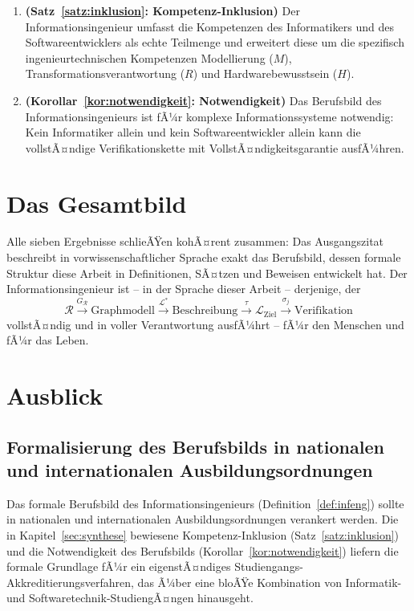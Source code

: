 ﻿\documentclass[a4paper,12pt]{report}
\theoremstyle{definition}
\begin{document}
\begin{enumerate}
  \item \textbf{(Satz~\ref{satz:inklusion}: Kompetenz-Inklusion)}
        Der Informationsingenieur umfasst die Kompetenzen des Informatikers und des
        Softwareentwicklers als echte Teilmenge und erweitert diese um die spezifisch
        ingenieurtechnischen Kompetenzen Modellierung ($M$), Transformationsverantwortung
        ($R$) und Hardwarebewusstsein ($H$).

  \item \textbf{(Korollar~\ref{kor:notwendigkeit}: Notwendigkeit)}
        Das Berufsbild des Informationsingenieurs ist fÃ¼r komplexe Informationssysteme
        notwendig: Kein Informatiker allein und kein Softwareentwickler allein kann
        die vollstÃ¤ndige Verifikationskette mit VollstÃ¤ndigkeitsgarantie ausfÃ¼hren.
\end{enumerate}

\section{Das Gesamtbild}

Alle sieben Ergebnisse schlieÃŸen kohÃ¤rent zusammen: Das Ausgangszitat beschreibt
in vorwissenschaftlicher Sprache exakt das Berufsbild, dessen formale Struktur
diese Arbeit in Definitionen, SÃ¤tzen und Beweisen entwickelt hat.
Der Informationsingenieur ist -- in der Sprache dieser Arbeit -- derjenige, der
\[
  \mathcal{R}
  \xrightarrow{G_\mathcal{R}} \text{Graphmodell}
  \xrightarrow{\mathcal{L}^*} \text{Beschreibung}
  \xrightarrow{\tau} \mathcal{L}_{\text{Ziel}}
  \xrightarrow{\sigma_j} \text{Verifikation}
\]
vollstÃ¤ndig und in voller Verantwortung ausfÃ¼hrt -- fÃ¼r den Menschen und fÃ¼r das Leben.


\section{Ausblick}
\label{sec:ausblick}

\subsection{Formalisierung des Berufsbilds in nationalen und internationalen Ausbildungsordnungen}

Das formale Berufsbild des Informationsingenieurs (Definition~\ref{def:infeng}) sollte
in nationalen und internationalen Ausbildungsordnungen verankert werden. Die in Kapitel~\ref{sec:synthese}
bewiesene Kompetenz-Inklusion (Satz~\ref{satz:inklusion}) und die Notwendigkeit des Berufsbilds
(Korollar~\ref{kor:notwendigkeit}) liefern die formale Grundlage fÃ¼r ein eigenstÃ¤ndiges
Studiengangs-Akkreditierungsverfahren, das Ã¼ber eine bloÃŸe Kombination von Informatik-
und Softwaretechnik-StudiengÃ¤ngen hinausgeht.
\end{document}
